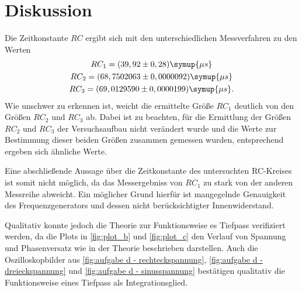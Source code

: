 \section{Diskussion}
\label{sec:Diskussion}
Die Zeitkonstante $RC$ ergibt sich mit den unterschiedlichen Messverfahren zu den Werten
\begin{gather}
    RC_{1} = (39,92\pm0,28) \symup{\mu s} \notag \\
    RC_{2} = (68,7502063\pm0,0000092)\symup{\mu s} \notag \\
    RC_{3} = (69,0129590\pm0,0000199)\symup{\mu s} \notag .
\end{gather}
Wie unschwer zu erkennen ist, weicht die ermittelte Größe $RC_{1}$ deutlich von den Größen
$RC_{2}$ und $RC_{3}$ ab. Dabei ist zu beachten, für die Ermittlung der Größen $RC_{2}$ und $RC_{3}$
der Versuchsaufbau nicht verändert wurde und die Werte zur Bestimmung dieser beiden Größen zusammen gemessen wurden,
entsprechend ergeben sich ähnliche Werte.

Eine abschließende Aussage über die Zeitkonstante des untersuchten RC-Kreises ist somit nicht möglich,
da das Messergebniss von $RC_{1}$ zu stark von der anderen Messreihe abweicht. Ein möglicher Grund hierfür ist
mangegelnde Genauigkeit des Frequenzgenerators und dessen nicht berücksichtigter Innenwiderstand.

Qualitativ konnte jedoch die Theorie zur Funktionsweise es Tiefpass verifiziert werden, da die Plots
in \autoref{fig:plot_b} und \autoref{fig:plot_c} den Verlauf von Spannung und Phasenversatz wie in der Theorie 
beschrieben darstellen.
Auch die Oszilloskopbilder aus \autoref{fig:aufgabe d - rechteckspannung}, \autoref{fig:aufgabe d - dreieckspannung}
und \autoref{fig:aufgabe d - sinusspannung} bestätigen qualitativ die Funktionsweise eines Tiefpass als Integrationsglied.